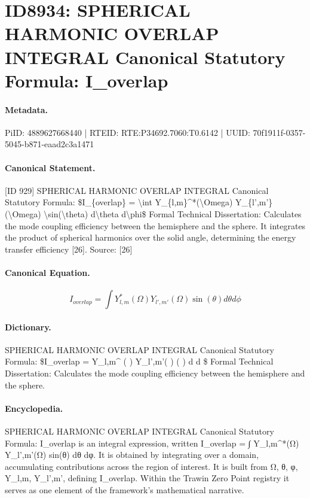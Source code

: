 \section*{ID8934: SPHERICAL HARMONIC OVERLAP INTEGRAL Canonical Statutory Formula: I\_overlap}
\paragraph{Metadata.}
PiID: 4889627668440 | RTEID: RTE:P34692.7060:T0.6142 | UUID: 70f1911f-0357-5045-b871-eaad2c3a1471

\paragraph{Canonical Statement.}
[ID 929] SPHERICAL HARMONIC OVERLAP INTEGRAL Canonical Statutory Formula: \$I\_\{overlap\} = \textbackslash{}int Y\_\{l,m\}\textasciicircum{}*(\textbackslash{}Omega) Y\_\{l',m'\}(\textbackslash{}Omega) \textbackslash{}sin(\textbackslash{}theta) d\textbackslash{}theta d\textbackslash{}phi\$ Formal Technical Dissertation: Calculates the mode coupling efficiency between the hemisphere and the sphere. It integrates the product of spherical harmonics over the solid angle, determining the energy transfer efficiency [26]. Source: [26]

\paragraph{Canonical Equation.}
\[
I_{overlap} = \int Y_{l,m}^*(\Omega) Y_{l',m'}(\Omega) \sin(\theta) d\theta d\phi
\]

\paragraph{Dictionary.}
SPHERICAL HARMONIC OVERLAP INTEGRAL Canonical Statutory Formula: \$I\_overlap = Y\_l,m\textasciicircum{} ( ) Y\_l',m'( ) ( ) d d \$ Formal Technical Dissertation: Calculates the mode coupling efficiency between the hemisphere and the sphere.

\paragraph{Encyclopedia.}
SPHERICAL HARMONIC OVERLAP INTEGRAL Canonical Statutory Formula: I\_overlap is an integral expression, written I\_overlap = ∫ Y\_l,m\textasciicircum{}*(Ω) Y\_l',m'(Ω) sin(θ) dθ dφ. It is obtained by integrating over a domain, accumulating contributions across the region of interest. It is built from Ω, θ, φ, Y\_l,m, Y\_l',m', defining I\_overlap. Within the Trawin Zero Point registry it serves as one element of the framework's mathematical narrative.
